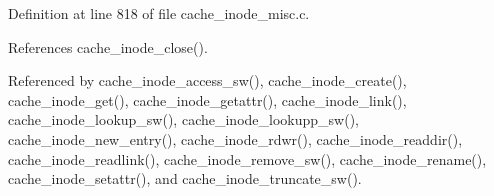 Definition at line 818 of file cache\_\-inode\_\-misc.c.

References cache\_\-inode\_\-close().

Referenced by cache\_\-inode\_\-access\_\-sw(), cache\_\-inode\_\-create(), cache\_\-inode\_\-get(), cache\_\-inode\_\-getattr(), cache\_\-inode\_\-link(), cache\_\-inode\_\-lookup\_\-sw(), cache\_\-inode\_\-lookupp\_\-sw(), cache\_\-inode\_\-new\_\-entry(), cache\_\-inode\_\-rdwr(), cache\_\-inode\_\-readdir(), cache\_\-inode\_\-readlink(), cache\_\-inode\_\-remove\_\-sw(), cache\_\-inode\_\-rename(), cache\_\-inode\_\-setattr(), and cache\_\-inode\_\-truncate\_\-sw().